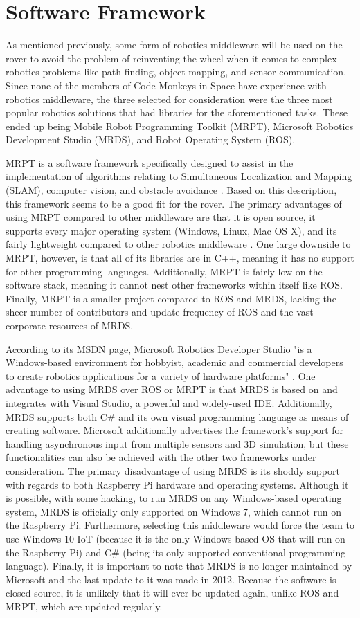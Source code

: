 \documentclass[onecolumn, draftclsnofoot,10pt, compsoc]{IEEEtran}
\begin{document}
\section{Software Framework}
As mentioned previously, some form of robotics middleware will be used on the rover to avoid the problem of reinventing the wheel when it comes to complex robotics problems like path finding, object mapping, and sensor communication. Since none of the members of Code Monkeys in Space have experience with robotics middleware, the three selected for consideration were the three most popular robotics solutions that had libraries for the aforementioned tasks. These ended up being Mobile Robot Programming Toolkit (MRPT), Microsoft Robotics Development Studio (MRDS), and Robot Operating System (ROS).

MRPT is a software framework specifically designed to assist in the implementation of algorithms relating to Simultaneous Localization and Mapping (SLAM), computer vision, and obstacle avoidance \cite{MRPT}. Based on this description, this framework seems to be a good fit for the rover. The primary advantages of using MRPT compared to other middleware are that it is open source, it supports every major operating system (Windows, Linux, Mac OS X), and its fairly lightweight compared to other robotics middleware \cite{MRPT}. One large downside to MRPT, however, is that all of its libraries are in C++, meaning it has no support for other programming languages. Additionally, MRPT is fairly low on the software stack, meaning it cannot nest other frameworks within itself like ROS. Finally, MRPT is a smaller project compared to ROS and MRDS, lacking the sheer number of contributors and update frequency of ROS and the vast corporate resources of MRDS.

According to its MSDN page, Microsoft Robotics Developer Studio "is a Windows-based environment for hobbyist, academic and commercial developers to create robotics applications for a variety of hardware platforms" \cite{MRDS}. One advantage to using MRDS over ROS or MRPT is that MRDS is based on and integrates with Visual Studio, a powerful and widely-used IDE. Additionally, MRDS supports both C\# and its own visual programming language as means of creating software. Microsoft additionally advertises the framework's support for handling asynchronous input from multiple sensors and 3D simulation, but these functionalities can also be achieved with the other two frameworks under consideration. The primary disadvantage of using MRDS is its shoddy support with regards to both Raspberry Pi hardware and operating systems. Although it is possible, with some hacking, to run MRDS on any Windows-based operating system, MRDS is officially only supported on Windows 7, which cannot run on the Raspberry Pi. Furthermore, selecting this middleware would force the team to use Windows 10 IoT (because it is the only Windows-based OS that will run on the Raspberry Pi) and C\# (being its only supported conventional programming language). Finally, it is important to note that MRDS is no longer maintained by Microsoft and the last update to it was made in 2012. Because the software is closed source, it is unlikely that it will ever be updated again, unlike ROS and MRPT, which are updated regularly.
\end{document}
